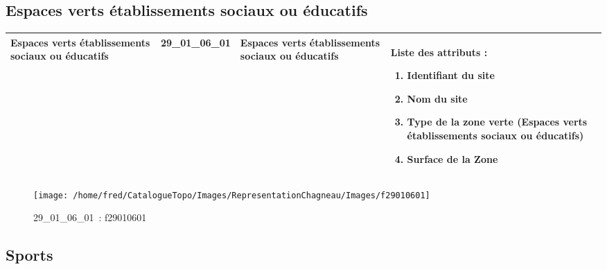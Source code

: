 \documentclass[12pt,titlepage]{book}
\begin{document}
\subsection{Espaces verts établissements sociaux ou éducatifs}
\noindent
\vspace{\baselineskip}

\renewcommand{\arraystretch}{1.2}
\begin{supertabular}{|p{10cm}|c|p{13cm}|p{12cm}|}
 Espaces verts établissements sociaux ou éducatifs & 29\_01\_06\_01 & Espaces verts établissements sociaux ou éducatifs & Liste des attributs :
\begin{enumerate}
  \item Identifiant du site  \item Nom du site  \item Type de la zone verte (Espaces verts établissements sociaux ou éducatifs)  \item Surface de la Zone\end{enumerate}
\\
\hline
\end{supertabular}
\begin{figure}[h!]
  \hfill         %
  \begin{minipage}[t]{3cm}
    \begin{center}
      \texttt{[image: /home/fred/CatalogueTopo/Images/RepresentationChagneau/Images/f29010601]}
      \caption[~29\_01\_06\_01]{\small{29\_01\_06\_01~:} \tiny{f29010601}}\label{f29010601}
    \end{center}
  \end{minipage}
\end{figure}


\subsection{Sports}
\noindent
\vspace{\baselineskip}
\end{document}
